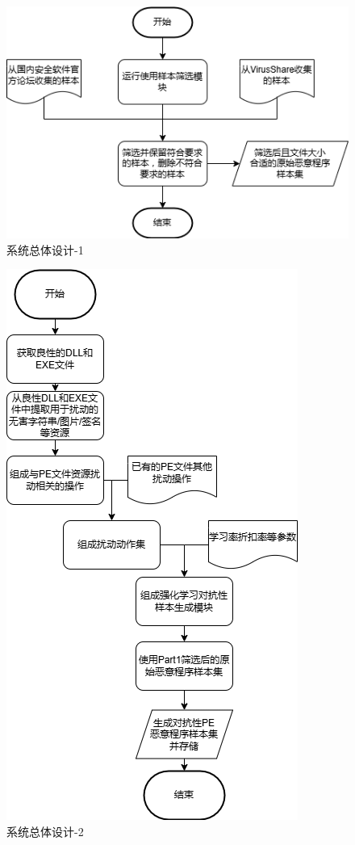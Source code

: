 \begin{figure}
  \centering
  \includegraphics[]{images/system_design1.png}
  \caption{系统总体设计-1}\label{fig:system_design1}
\end{figure}
\begin{figure}
  \centering
  \includegraphics[scale=0.80]{images/system_design2.png}
  \caption{系统总体设计-2}\label{fig:system_design2}
\end{figure}
